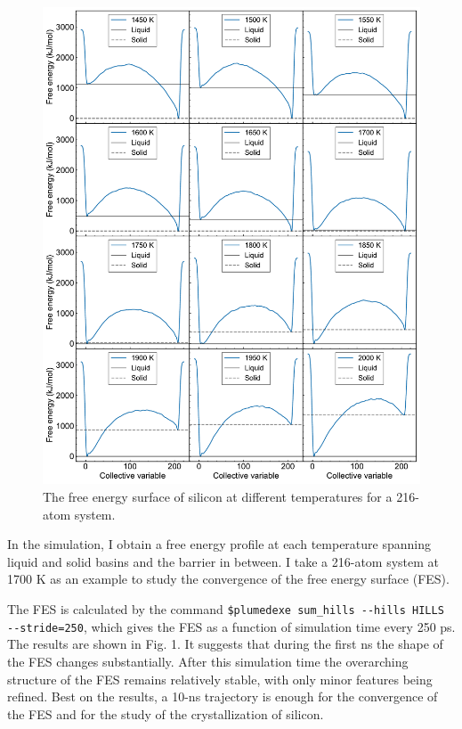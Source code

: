 \documentclass{article}
\begin{document}
\begin{figure}[p]
    \centering
    \includegraphics[width=\textwidth]{./plot/fes.pdf}
    \caption{The free energy surface of silicon at different temperatures for a 216-atom system.}
\end{figure}

In the simulation, I obtain a free energy profile at each temperature spanning liquid and solid basins and the barrier in between. I take a 216-atom system at 1700 K as an example to study the convergence of the free energy surface (FES). 

The FES is calculated by the command \verb|$plumedexe sum_hills --hills HILLS --stride=250|, which gives the FES as a function of simulation time every 250 ps. The results are shown in Fig. 1. It suggests that during the first ns the shape of the FES changes substantially. After this simulation time the overarching structure of the FES remains relatively stable, with only minor features being refined. Best on the results, a 10-ns trajectory is enough for the convergence of the FES and for the study of the crystallization of silicon.
\end{document}
